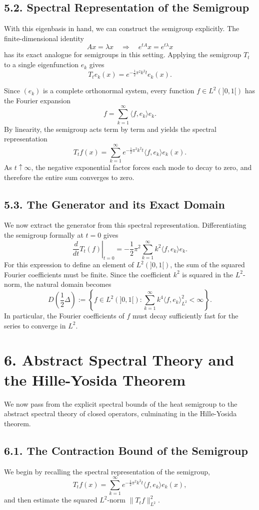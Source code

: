 \documentclass[11pt]{article}
\theoremstyle{definition}
\theoremstyle{remark}
\begin{document}
\subsection*{5.2. Spectral Representation of the Semigroup}
With this eigenbasis in hand, we can construct the semigroup explicitly. The finite-dimensional identity
\[
Ax=\lambda x
\quad \Longrightarrow \quad
e^{tA}x=e^{t\lambda}x
\]
has its exact analogue for semigroups in this setting. Applying the semigroup \(T_t\) to a single eigenfunction \(e_k\) gives
\[
T_t e_k(x)=e^{-\frac12\pi^2 k^2 t}e_k(x).
\]

Since \((e_k)\) is a complete orthonormal system, every function \(f\in L^2(]0,1[)\) has the Fourier expansion
\[
f=\sum_{k=1}^\infty \langle f,e_k\rangle e_k.
\]
By linearity, the semigroup acts term by term and yields the spectral representation
\[
T_t f(x)=\sum_{k=1}^\infty e^{-\frac12\pi^2 k^2 t}\langle f,e_k\rangle e_k(x).
\]
As \(t\uparrow \infty\), the negative exponential factor forces each mode to decay to zero, and therefore the entire sum converges to zero.

\subsection*{5.3. The Generator and its Exact Domain}
We now extract the generator from this spectral representation. Differentiating the semigroup formally at \(t=0\) gives
\[
\left.\frac{d}{dt}T_t(f)\right|_{t=0}
=
-\frac12\pi^2\sum_{k=1}^\infty k^2\langle f,e_k\rangle e_k.
\]
For this expression to define an element of \(L^2(]0,1[)\), the sum of the squared Fourier coefficients must be finite. Since the coefficient \(k^2\) is squared in the \(L^2\)-norm, the natural domain becomes
\[
D\!\left(\frac12\Delta\right)
:=
\left\{
f\in L^2(]0,1[):
\sum_{k=1}^\infty k^4 \langle f,e_k\rangle_{L^2}^2<\infty
\right\}.
\]
In particular, the Fourier coefficients of \(f\) must decay sufficiently fast for the series to converge in \(L^2\).

\section*{6. Abstract Spectral Theory and the Hille-Yosida Theorem}
We now pass from the explicit spectral bounds of the heat semigroup to the abstract spectral theory of closed operators, culminating in the Hille-Yosida theorem.

\subsection*{6.1. The Contraction Bound of the Semigroup}
We begin by recalling the spectral representation of the semigroup,
\[
T_t f(x)
=
\sum_{k=1}^\infty e^{-\frac12\pi^2 k^2 t}\langle f,e_k\rangle e_k(x),
\]
and then estimate the squared \(L^2\)-norm \(\|T_t f\|_{L^2}^2\).
\end{document}
